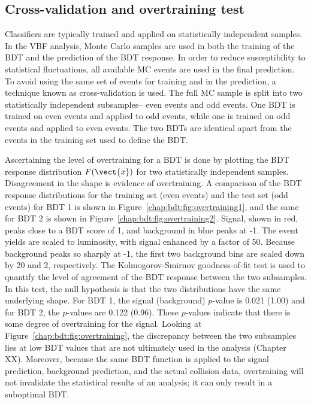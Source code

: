 \subsection{Cross-validation and overtraining test}

Classifiers are typically trained and applied on statistically
independent samples. In the VBF analysis, Monte Carlo samples are used
in both the training of the BDT and the prediction of the BDT
response. In order to reduce susceptibility to statistical
fluctuations, all available MC events are used in the final
prediction. To avoid using the same set of events for training and in
the prediction, a technique known as cross-validation is used. The full
MC sample is split into two statistically independent subsamples--
even events and odd events. One BDT is trained on even events and
applied to odd events, while one is trained on odd events and applied
to even events. The two BDTs are identical apart from the events in
the training set used to define the BDT. 

Ascertaining the level of overtraining for a BDT is done by plotting
the BDT response distribution $F(\vect{x})$ for two statistically
independent samples. Disagreement in the shape is evidence of
overtraining. A comparison of the BDT response distributions for the
training set (even events) and the test set (odd events) for BDT 1 is
shown in Figure~\ref{chap:bdt:fig:overtraining1}, and the same for BDT
2 is shown in Figure~\ref{chap:bdt:fig:overtraining2}. Signal, shown
in red, peaks close to a BDT score of 1, and background in blue peaks
at -1. The event yields are scaled to luminosity, with signal enhanced
by a factor of 50. Because background peaks so sharply at -1, the
first two background bins are scaled down by 20 and 2,
respectively. The Kolmogorov-Smirnov goodness-of-fit test is used to
quantify the level of agreement of the BDT response between the two
subsamples. In this test, the null hypothesis is that the two
distributions have the same underlying shape. For BDT 1, the signal
(background) $p$-value is 0.021 (1.00) and for BDT 2, the $p$-values
are 0.122 (0.96). These $p$-values indicate that there is some degree
of overtraining for the signal. Looking at
Figure~\ref{chap:bdt:fig:overtraining}, the discrepancy
between the two subsamples lies at low BDT values that are not
ultimately used in the analysis (Chapter XX). Moreover, because the
same BDT function is applied to the signal prediction, background
prediction, and the actual collision data, overtraining will not
invalidate the statistical results of an analysis; it can only result
in a suboptimal BDT.

